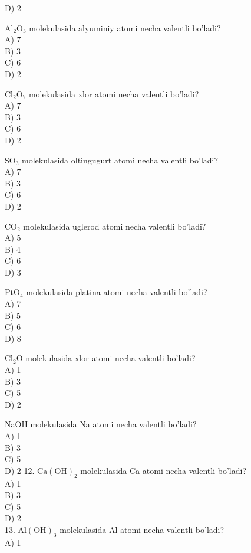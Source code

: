 D) 2
  \item $\mathrm{Al}_{2} \mathrm{O}_{3}$ molekulasida alyuminiy atomi necha valentli bo'ladi?\\
A) 7\\
B) 3\\
C) 6\\
D) 2
  \item $\mathrm{Cl}_{2} \mathrm{O}_{7}$ molekulasida xlor atomi necha valentli bo'ladi?\\
A) 7\\
B) 3\\
C) 6\\
D) 2
  \item $\mathrm{SO}_{3}$ molekulasida oltingugurt atomi necha valentli bo'ladi?\\
A) 7\\
B) 3\\
C) 6\\
D) 2
  \item $\mathrm{CO}_{2}$ molekulasida uglerod atomi necha valentli bo'ladi?\\
A) 5\\
B) 4\\
C) 6\\
D) 3
  \item $\mathrm{PtO}_{4}$ molekulasida platina atomi necha valentli bo'ladi?\\
A) 7\\
B) 5\\
C) 6\\
D) 8
  \item $\mathrm{Cl}_{2} \mathrm{O}$ molekulasida xlor atomi necha valentli bo'ladi?\\
A) 1\\
B) 3\\
C) 5\\
D) 2
  \item NaOH molekulasida Na atomi necha valentli bo'ladi?\\
A) 1\\
B) 3\\
C) 5\\
D) 2
12. $\mathrm{Ca}(\mathrm{OH})_{2}$ molekulasida Ca atomi necha valentli bo'ladi?\\
A) 1\\
B) 3\\
C) 5\\
D) 2\\
13. $\mathrm{Al}(\mathrm{OH})_{3}$ molekulasida Al atomi necha valentli bo'ladi?\\
A) 1\\

